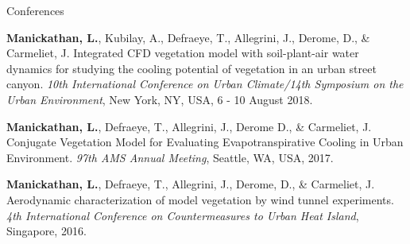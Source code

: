 \documentclass[11pt, a4paper]{preamble/awesome-cv-novo}
\begin{document}
\begin{cventries}
  \cvpubentry
  {Conferences}
  {
    \begin{cvitems}
      \item {\textbf{Manickathan, L.}, Kubilay, A., Defraeye, T., Allegrini, J., Derome, D., \& Carmeliet, J.
             Integrated CFD vegetation model with soil-plant-air water dynamics for studying the cooling potential
             of vegetation in an urban street canyon. {\bodyfontlight\textit{10th International Conference on
             Urban Climate/14th Symposium on the Urban Environment}, New York, NY, USA, 6 - 10 August 2018.}}
      \item {\textbf{Manickathan, L.}, Defraeye, T., Allegrini, J., Derome D., \& Carmeliet, J. Conjugate
             Vegetation Model for Evaluating Evapotranspirative Cooling in Urban Environment.
             {\bodyfontlight\textit{97th AMS Annual Meeting}, Seattle, WA, USA, 2017.}}
      \item {\textbf{Manickathan, L.}, Defraeye, T., Allegrini, J., Derome, D., \& Carmeliet, J. Aerodynamic
             characterization of model vegetation by wind tunnel experiments. {\bodyfontlight\textit{4th
             International Conference on Countermeasures to Urban Heat Island}, Singapore, 2016.}}
    \end{cvitems}
  }

\end{cventries}
\end{document}
